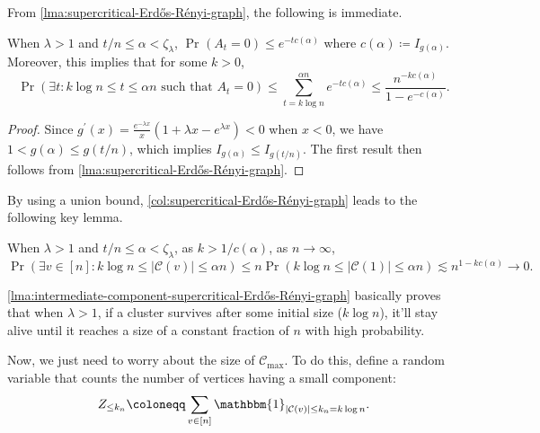 From \autoref{lma:supercritical-Erdős-Rényi-graph}, the following is immediate.

\begin{corollary}\label{col:supercritical-Erdős-Rényi-graph}
	When \(\lambda > 1\) and \(t / n \leq \alpha < \zeta _\lambda \), \(\Pr_{}(A_t = 0) \leq e^{-t c(\alpha )} \) where \(c(\alpha ) \coloneqq I_{g(\alpha )}\). Moreover, this implies that for some \(k > 0\),
	\[
		\Pr_{}(\exists t\colon k \log n \leq t \leq \alpha n \text{ such that } A_t = 0)
		\leq \sum_{t = k \log n}^{\alpha n} e^{-t c(\alpha )}
		\leq \frac{n^{-k c(\alpha )}}{1 - e^{-c(\alpha )}}.
	\]
\end{corollary}
\begin{proof}
	Since \(g^{\prime} (x) = \frac{e^{-\lambda x}}{x} (1 + \lambda x - e^{\lambda x}) < 0\) when \(x < 0\), we have \(1 < g(\alpha ) \leq g(t / n)\), which implies \(I_{g(\alpha )} \leq I_{g(t / n)}\). The first result then follows from \autoref{lma:supercritical-Erdős-Rényi-graph}.
\end{proof}

By using a union bound, \autoref{col:supercritical-Erdős-Rényi-graph} leads to the following key lemma.

\begin{lemma}\label{lma:intermediate-component-supercritical-Erdős-Rényi-graph}
	When \(\lambda > 1\) and \(t / n \leq \alpha < \zeta _{\lambda }\), as \(k > 1 / c(\alpha )\), as \(n \to \infty \),
	\[
		\Pr_{}(\exists v \in [n] \colon k \log n \leq \lvert \mathcal{C} (v) \rvert \leq \alpha n)
		\leq n \Pr_{}(k \log n \leq \lvert \mathcal{C} (1) \rvert \leq \alpha n)
		\lesssim n^{1 - k c(\alpha )}
		\to 0.
	\]
\end{lemma}

\begin{remark}
	\autoref{lma:intermediate-component-supercritical-Erdős-Rényi-graph} basically proves that when \(\lambda > 1\), if a cluster survives after some initial size (\(k \log n\)), it'll stay alive until it reaches a size of a constant fraction of \(n\) with high probability.
\end{remark}

Now, we just need to worry about the size of \(\mathcal{C} _{\max }\). To do this, define a random variable that counts the number of vertices having a small component:
\[
	Z_{\leq k_n}
	\coloneqq \sum_{v \in [n]} \mathbbm{1}_{\lvert \mathcal{C} (v) \rvert \leq k_n = k \log n}.
\]


